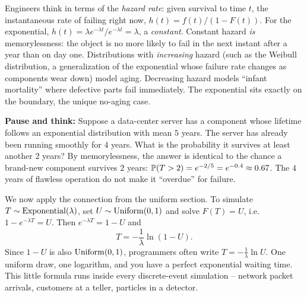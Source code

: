 \begin{connectionbox}
Engineers think in terms of the \emph{hazard rate}: given survival to time $t$,
the instantaneous rate of failing right now, $h(t) = f(t)/(1-F(t))$. For the
exponential, $h(t) = \lambda e^{-\lambda t}/e^{-\lambda t} = \lambda$, a
\emph{constant}. Constant hazard \emph{is} memorylessness: the object is no more
likely to fail in the next instant after a year than on day one. Distributions
with \emph{increasing} hazard (such as the Weibull distribution, a generalization of
the exponential whose failure rate changes as components wear down) model
aging. Decreasing hazard models ``infant mortality'' where defective parts fail
immediately. The exponential sits exactly on the boundary, the unique no-aging case.
\end{connectionbox}

\begin{walkbox}
\textbf{Pause and think:} Suppose a data-center server has a component whose
lifetime follows an exponential distribution with mean $5$ years. The server has
already been running smoothly for $4$ years. What is the probability it survives
at least another $2$ years?
By memorylessness, the answer is identical to the chance a brand-new component
survives $2$ years: $\P(T > 2) = e^{-2/5} = e^{-0.4} \approx 0.67$. The $4$
years of flawless operation do not make it ``overdue'' for failure.
\end{walkbox}

\begin{example}
\label{ch11:ex-inverse}
We now apply the connection from the uniform section. To simulate
$T\sim\Expo(\lambda)$, set $U\sim\Unif(0,1)$ and solve $F(T)=U$, i.e.\
$1 - e^{-\lambda T} = U$. Then $e^{-\lambda T} = 1-U$ and
\[
  T = -\frac{1}{\lambda}\ln(1-U).
\]
Since $1-U$ is also $\Unif(0,1)$, programmers often write
$T = -\tfrac{1}{\lambda}\ln U$. One uniform draw, one logarithm, and you have a
perfect exponential waiting time. This little formula runs inside every
discrete-event simulation -- network packet arrivals, customers at a teller,
particles in a detector.
\end{example}

